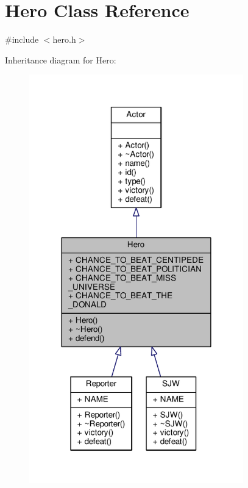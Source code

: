 \hypertarget{classHero}{}\section{Hero Class Reference}
\label{classHero}


{\ttfamily \#include $<$hero.\+h$>$}



Inheritance diagram for Hero\+:
\nopagebreak
\begin{figure}[H]
\begin{center}
\leavevmode
\includegraphics[width=263pt]{classHero__inherit__graph}
\end{center}
\end{figure}


